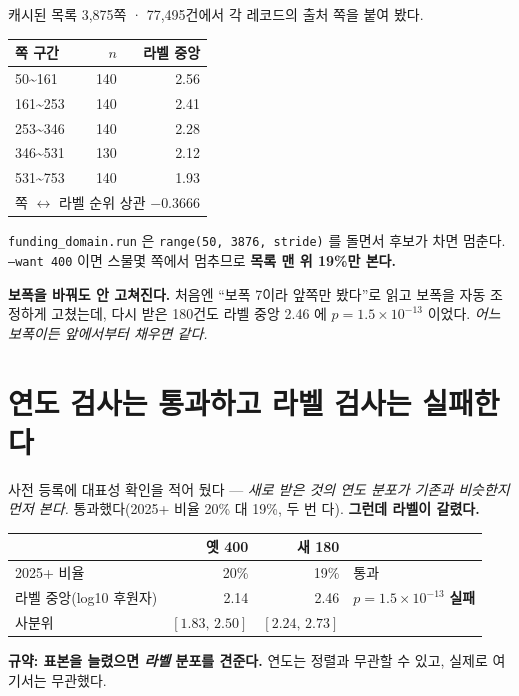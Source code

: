 \documentclass[11pt]{article}
\begin{document}
캐시된 목록 3,875쪽 · 77,495건에서 각 레코드의 출처 쪽을 붙여 봤다.

\begin{center}
\begin{tabular}{lrr}
\hline
쪽 구간 & $n$ & 라벨 중앙 \\
\hline
50\textasciitilde{}161 & 140 & 2.56 \\
161\textasciitilde{}253 & 140 & 2.41 \\
253\textasciitilde{}346 & 140 & 2.28 \\
346\textasciitilde{}531 & 130 & 2.12 \\
531\textasciitilde{}753 & 140 & 1.93 \\
\hline
\multicolumn{3}{c}{쪽 $\leftrightarrow$ 라벨 순위 상관 $\mathbf{-0.3666}$} \\
\hline
\end{tabular}
\end{center}

\texttt{funding\_domain.run} 은 \texttt{range(50, 3876, stride)} 를 돌면서
후보가 차면 멈춘다. \texttt{--want 400} 이면 스물몇 쪽에서 멈추므로
\textbf{목록 맨 위 19\%만 본다.}

\textbf{보폭을 바꿔도 안 고쳐진다.} 처음엔 ``보폭 7이라 앞쪽만 봤다''로
읽고 보폭을 자동 조정하게 고쳤는데, 다시 받은 180건도 라벨 중앙 2.46 에
$p=1.5\times10^{-13}$ 이었다. \emph{어느 보폭이든 앞에서부터 채우면 같다.}

\section{연도 검사는 통과하고 라벨 검사는 실패한다}

사전 등록에 대표성 확인을 적어 뒀다 --- \emph{새로 받은 것의 연도 분포가
기존과 비슷한지 먼저 본다.} 통과했다(2025+ 비율 20\% 대 19\%, 두 번 다).
\textbf{그런데 라벨이 갈렸다.}

\begin{center}
\begin{tabular}{lrrl}
\hline
 & 옛 400 & 새 180 & \\
\hline
2025+ 비율 & 20\% & 19\% & 통과 \\
라벨 중앙(log10 후원자) & 2.14 & 2.46 & $p=1.5\times10^{-13}$ \textbf{실패} \\
사분위 & $[1.83,\,2.50]$ & $[2.24,\,2.73]$ & \\
\hline
\end{tabular}
\end{center}

\textbf{규약: 표본을 늘렸으면 \emph{라벨} 분포를 견준다.} 연도는 정렬과
무관할 수 있고, 실제로 여기서는 무관했다.
\end{document}

